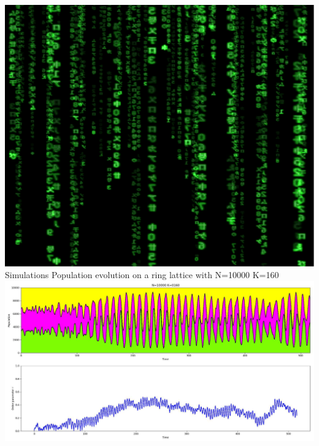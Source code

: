 \documentclass[serif,mathserif]{beamer}
\begin{document}
\begin{frame}{\includegraphics[height=0.06\textheight]{matrix.eps}\hspace{0.25cm} Simulations}
    \centering
    Population evolution on a ring lattice with N=10000 K=160\\
    \vspace{0.4cm}
    \includegraphics[width=\textwidth]{pop-evolution-stacked-K_160.eps}
\end{frame}
\end{document}
